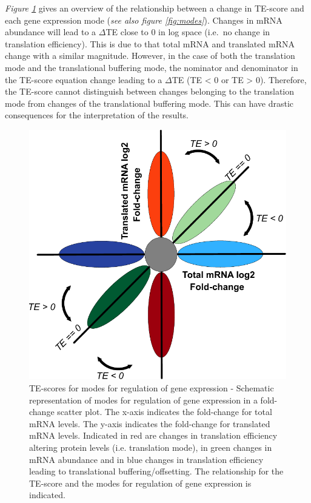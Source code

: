 \documentclass[12pt,openany]{book}
\begin{document}
\emph{Figure \ref{fig:TE}} gives an overview of the relationship between
a change in TE-score and each gene expression mode (\emph{see also
figure \ref{fig:modes}}). Changes in mRNA abundance will lead to a
\(\varDelta\)TE close to 0 in log space (i.e.~no change in translation
efficiency). This is due to that total mRNA and translated mRNA change
with a similar magnitude. However, in the case of both the translation
mode and the translational buffering mode, the nominator and denominator
in the TE-score equation change leading to a \(\varDelta\)TE (TE
\textless{} 0 or TE \textgreater{} 0). Therefore, the TE-score cannot
distinguish between changes belonging to the translation mode from
changes of the translational buffering mode. This can have drastic
consequences for the interpretation of the results. \clearpage

\begin{figure}
  \includegraphics{./figures/geneModes_TE.pdf}
  \caption{TE-scores for modes for regulation of gene expression -  Schematic representation of modes for regulation of gene expression in a fold-change scatter plot. The x-axis indicates the fold-change for total mRNA levels. The y-axis indicates the fold-change for translated mRNA levels. Indicated in red are changes in translation efficiency altering protein levels (i.e. translation mode), in green changes in mRNA abundance and in blue changes in translation efficiency leading to translational buffering/offsetting. The relationship for the TE-score and the modes for regulation of gene expression is indicated. \label{fig:TE}}
\end{figure}
\end{document}
